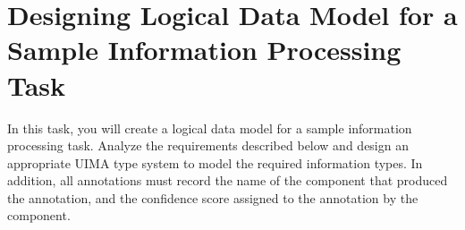 
\chapter{Designing Logical Data Model for a Sample Information Processing Task}

In this task, you will create a logical data model for a sample information
processing task. Analyze the requirements described below and design an
appropriate UIMA type system to model the required information types. 
In addition, all annotations must record the name of the component that produced the annotation, and the confidence score assigned to the annotation by the component.






